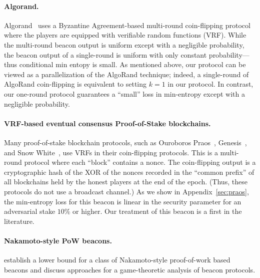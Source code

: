 \paragraph{Algorand.} 
Algorand~\cite{Algorand} uses a Byzantine Agreement-based multi-round
coin-flipping protocol where the players are equipped with verifiable
random functions (VRF).  While the multi-round beacon output is
uniform except with a negligible probability, the beacon output of a
single-round is uniform with only constant probability---thus
conditional min entopy is small. As mentioned above, our protocol can
be viewed as a parallelization of the AlgoRand technique; indeed, a
single-round of AlgoRand coin-flipping is equivalent to setting
$k = 1$ in our protocol.  In contrast, our one-round protocol
guarantees a ``small'' loss in min-entropy except with a negligible
probability.


\paragraph{VRF-based eventual consensus Proof-of-Stake blockchains.}
Many proof-of-stake blockchain
protocols, such as Ouroboros Praos~\cite{Praos}, 
Genesis~\cite{Genesis}, and Snow White~\cite {SnowWhite}, 
use VRFs 
in their coin-flipping protocols. 
This is a multi-round protocol 
where each ``block'' contains a nonce.  
The coin-flipping output is a cryptographic hash 
of the XOR of the nonces 
recorded in the ``common prefix'' of all 
blockchains held by the honest players 
at the end of the epoch. 
(Thus, these protocols do not use a broadcast channel.)
As we show in Appendix~\ref{sec:praos}, 
the min-entropy loss for this beacon 
is linear in the security parameter 
for an adversarial stake $10\%$ or higher.
Our treatment of this beacon 
is a first in the literature. 

\paragraph{Nakamoto-style PoW beacons.} 
\citet{ZuckermanBeacon} establish a lower bound for a class of
Nakamoto-style proof-of-work based beacons and discuss approaches for
a game-theoretic analysis of beacon protocols.
